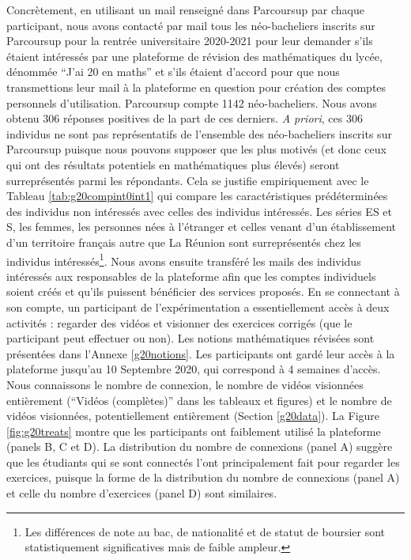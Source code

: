 \documentclass[
]{book}
\begin{document}
Concrètement, en utilisant un mail renseigné dans Parcoursup par chaque participant, nous avons contacté par mail tous les néo-bacheliers inscrits sur Parcoursup pour la rentrée universitaire 2020-2021 pour leur demander s'ils étaient intéressés par une plateforme de révision des mathématiques du lycée, dénommée ``J'ai 20 en maths'' et s'ils étaient d'accord pour que nous transmettions leur mail à la plateforme en question pour création des comptes personnels d'utilisation. Parcoursup compte 1142 néo-bacheliers. Nous avons obtenu 306 réponses positives de la part de ces derniers. \emph{A priori}, ces 306 individus ne sont pas représentatifs de l'ensemble des néo-bacheliers inscrits sur Parcoursup puisque nous pouvons supposer que les plus motivés (et donc ceux qui ont des résultats potentiels en mathématiques plus élevés) seront surreprésentés parmi les répondants. Cela se justifie empiriquement avec le Tableau \ref{tab:g20compint0int1} qui compare les caractéristiques prédéterminées des individus non intéressés avec celles des individus intéressés. Les séries ES et S, les femmes, les personnes nées à l'étranger et celles venant d'un établissement d'un territoire français autre que La Réunion sont surreprésentés chez les individus intéressés\footnote{Les différences de note au bac, de nationalité et de statut de boursier sont statistiquement significatives mais de faible ampleur.}.
Nous avons ensuite transféré les mails des individus intéressés aux responsables de la plateforme afin que les comptes individuels soient créés et qu'ils puissent bénéficier des services proposés. En se connectant à son compte, un participant de l'expérimentation a essentiellement accès à deux activités : regarder des vidéos et visionner des exercices corrigés (que le participant peut effectuer ou non). Les notions mathématiques révisées sont présentées dans l'Annexe \ref{g20notions}. Les participants ont gardé leur accès à la plateforme jusqu'au 10 Septembre 2020, qui correspond à 4 semaines d'accès.\\
Nous connaissons le nombre de connexion, le nombre de vidéos visionnées entièrement (``Vidéos (complètes)'' dans les tableaux et figures) et le nombre de vidéos visionnées, potentiellement entièrement (Section \ref{g20data}). La Figure \ref{fig:g20treats} montre que les participants ont faiblement utilisé la plateforme (panels B, C et D). La distribution du nombre de connexions (panel A) suggère que les étudiants qui se sont connectés l'ont principalement fait pour regarder les exercices, puisque la forme de la distribution du nombre de connexions (panel A) et celle du nombre d'exercices (panel D) sont similaires.
\end{document}
